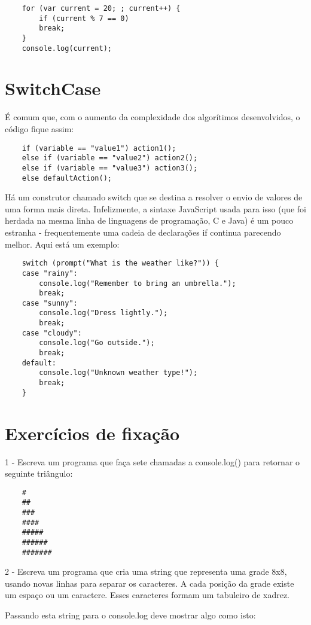 \begin{lstlisting}
	for (var current = 20; ; current++) {
		if (current % 7 == 0)
		break;
	}
	console.log(current);
\end{lstlisting}

\section{SwitchCase}

É comum que, com o aumento da complexidade dos algorítimos desenvolvidos, o código fique assim:

\begin{lstlisting}
	if (variable == "value1") action1();
	else if (variable == "value2") action2();
	else if (variable == "value3") action3();
	else defaultAction();
\end{lstlisting}

Há um construtor chamado switch que se destina a resolver o envio de valores de uma forma mais direta. Infelizmente, a sintaxe JavaScript usada para isso (que foi herdada na mesma linha de linguagens de programação, C e Java) é um pouco estranha - frequentemente uma cadeia de declarações if continua parecendo melhor. Aqui está um exemplo:

\begin{lstlisting}
	switch (prompt("What is the weather like?")) {
	case "rainy":
		console.log("Remember to bring an umbrella.");
		break;
	case "sunny":
		console.log("Dress lightly.");
		break;
	case "cloudy":
		console.log("Go outside.");
		break;
	default:
		console.log("Unknown weather type!");
		break;
	}
\end{lstlisting}

\section{Exercícios de fixação}

1 - Escreva um programa que faça sete chamadas a console.log() para retornar o seguinte triângulo:
	
	\begin{lstlisting}
	#
	##
	###
	####
	#####
	######
	#######
	\end{lstlisting}
	
2 - Escreva um programa que cria uma string que representa uma grade 8x8, usando novas linhas para separar os caracteres. A cada posição da grade existe um espaço ou um caractere. Esses caracteres formam um tabuleiro de xadrez.
	
Passando esta string para o console.log deve mostrar algo como isto:
	
